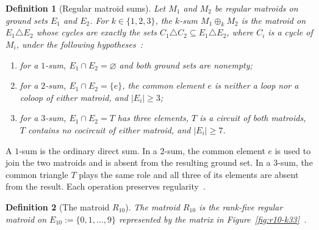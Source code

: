 \documentclass[11pt]{article}
\numberwithin{equation}{section}
\newtheorem{definition}{Definition}[section]
\theoremstyle{remark}
\begin{document}
\begin{definition}[Regular matroid sums]
\label{def:regular-matroid-sums}
Let $M_1$ and $M_2$ be regular matroids on ground sets $E_1$ and $E_2$.
For $k\in\{1,2,3\}$, the \emph{$k$-sum} $M_1\oplus_k M_2$ is the matroid on
$E_1\triangle E_2$ whose cycles are exactly the sets
$C_1\triangle C_2\subseteq E_1\triangle E_2$, where $C_i$ is a cycle of
$M_i$, under the following hypotheses~\cite{Seymour1980,Oxley2011}:
\begin{enumerate}
    \item for a $1$-sum, $E_1\cap E_2=\varnothing$ and both ground sets are
    nonempty;
    \item for a $2$-sum, $E_1\cap E_2=\{e\}$, the common element $e$ is
    neither a loop nor a coloop of either matroid, and $|E_i|\geq3$;
    \item for a $3$-sum, $E_1\cap E_2=T$ has three elements, $T$ is a
    circuit of both matroids, $T$ contains no cocircuit of either matroid,
    and $|E_i|\geq7$.
\end{enumerate}
\end{definition}

A $1$-sum is the ordinary direct sum. In a $2$-sum, the common element $e$
is used to join the two matroids and is absent from the resulting ground
set. In a $3$-sum, the common triangle $T$ plays the same role and all three
of its elements are absent from the result. Each operation preserves
regularity~\cite{Seymour1980,Oxley2011}.

\begin{definition}[The matroid \texorpdfstring{$R_{10}$}{R10}]
\label{def:r10}
The matroid $R_{10}$ is the rank-five regular matroid on
$E_{10}:=\{0,1,\ldots,9\}$ represented by the matrix in
Figure~\ref{fig:r10-k33}~\cite{Seymour1980,Oxley2011}.
\end{definition}
\end{document}
